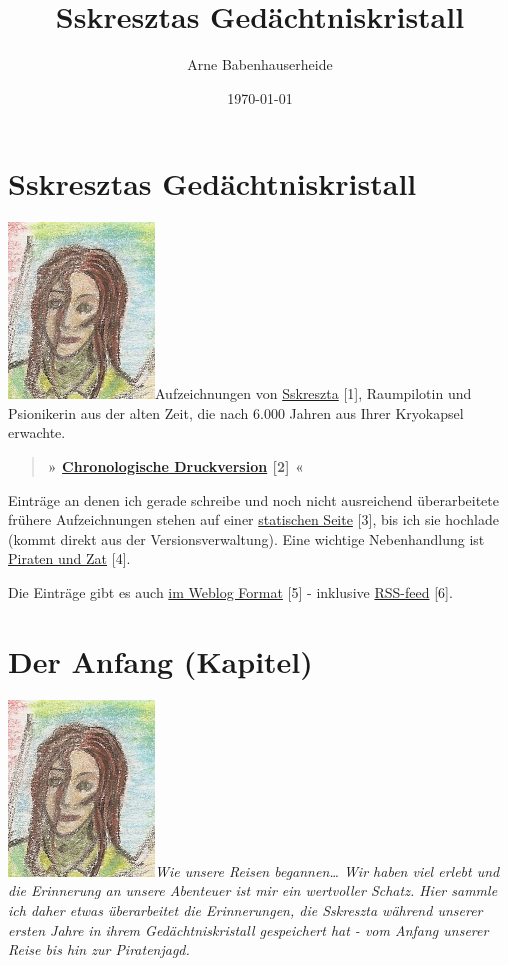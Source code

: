 \documentclass[11pt]{article}
\title{Sskresztas Gedächtniskristall}
\author{Arne Babenhauserheide}
\date{\today}
\begin{document}
\maketitle

\section{Sskresztas Gedächtniskristall}

\includegraphics{sskreszta-portrait-alt-klein.png}Aufzeichnungen
von
\href{http://1w6.org/deutsch/kampagnen/w-chter-der-zeit/charaktere/sskreszta}{Sskreszta}
{[}1{]}, Raumpilotin und Psionikerin aus der alten Zeit, die nach 6.000
Jahren aus Ihrer Kryokapsel erwachte.

\begin{quote}
\textbf{» \href{http://1w6.org/print/book/export/html/59}{Chronologische
Druckversion} {[}2{]} «}

\end{quote}
Einträge an denen ich gerade schreibe und noch nicht ausreichend
überarbeitete frühere Aufzeichnungen stehen auf einer
\href{http://1w6.org/rpg\_logs/sskreszta/index.html}{statischen Seite}
{[}3{]}, bis ich sie hochlade (kommt direkt aus der Versionsverwaltung).
Eine wichtige Nebenhandlung ist
\href{http://1w6.org/deutsch/welten/raumzeit/geschichten/piraten-und-zerg}{Piraten
und Zat} {[}4{]}.

Die Einträge gibt es auch
\href{http://1w6.org/stichwort/sskreszta-log}{im Weblog Format} {[}5{]}
- inklusive \href{http://1w6.org/stichwort/sskreszta-log/feed}{RSS-feed}
{[}6{]}.

\section{Der Anfang (Kapitel)}

\includegraphics{sskreszta-portrait-alt-klein.png}\emph{Wie
unsere Reisen begannen\ldots{} Wir haben viel erlebt und die Erinnerung
an unsere Abenteuer ist mir ein wertvoller Schatz. Hier sammle ich daher
etwas überarbeitet die Erinnerungen, die Sskreszta während unserer
ersten Jahre in ihrem Gedächtniskristall gespeichert hat - vom Anfang
unserer Reise bis hin zur Piratenjagd.}
\end{document}
